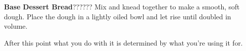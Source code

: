 \documentclass[../Cookbook.tex]{subfiles}
\begin{document}
\begin{recipe}[BaseDessertBread]{\textbf{Base Dessert Bread}}{???}{???}
	Mix and knead together to make a smooth, soft dough.
	Place the dough in a lightly oiled bowl and let rise until doubled in volume.
	
	After this point what you do with it is determined by what you're using it for.
\end{recipe}
\end{document}
